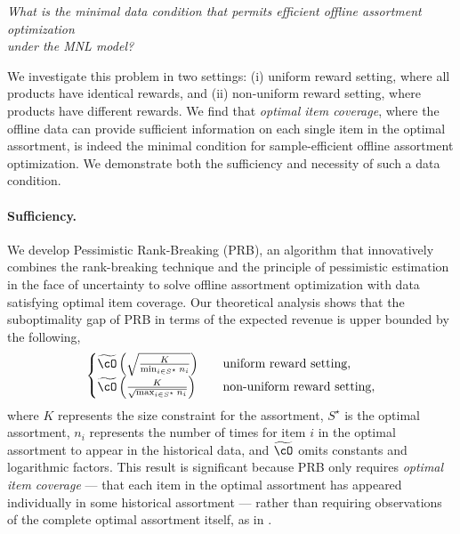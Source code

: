 \documentclass[10pt, letterpaper]{article}
\begin{document}
\begin{center}
\textit{What is the minimal data condition that permits efficient offline assortment optimization \\ under the MNL model?}
\end{center}

We investigate this problem in two settings: (i) uniform reward setting, where all products have identical rewards, and (ii) non-uniform reward setting, where products have different rewards. We find that \emph{optimal item coverage}, where the offline data can provide sufficient information on each single item in the optimal assortment, is indeed the minimal condition for sample-efficient offline assortment optimization.
We demonstrate both the sufficiency and necessity of such a data condition. 

\paragraph{Sufficiency.} We develop Pessimistic Rank-Breaking (PRB), an algorithm that innovatively combines the rank-breaking technique \citep{saha2019active,saha2024stop} and the principle of pessimistic estimation in the face of uncertainty to solve offline assortment optimization with data satisfying optimal item coverage. 
Our theoretical analysis shows that the suboptimality gap of PRB in terms of the expected revenue is upper bounded by the following,
\begin{align*}
\begin{cases}
    \widetilde{\cO}\left(\sqrt{\frac{K}{\min_{i\in S^\star} n_i}}\right) & \quad \text{uniform reward setting}, \\
    \widetilde{\cO}\left(\frac{K}{\sqrt{\max_{i \in S^\star} n_i}}\right) & \quad \text{non-uniform reward setting},
\end{cases}
\end{align*}
where $K$ represents the size constraint for the assortment, $S^\star$ is the optimal assortment, $n_i$ represents the number of times for item $i$ in the optimal assortment to appear in the historical data, and $\widetilde{\cO}$ omits constants and logarithmic factors.  This result is significant because PRB only requires \emph{optimal item coverage} --- that each item in the optimal assortment has appeared individually in some historical assortment --- rather than requiring observations of the complete optimal assortment itself, as in \citet{dong2023pasta}.
\end{document}
